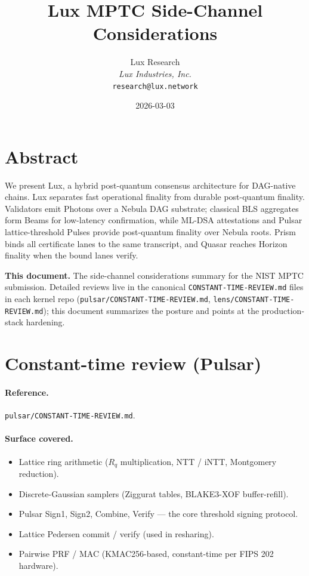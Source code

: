 \documentclass[11pt,a4paper]{article}
\title{Lux MPTC Side-Channel Considerations}
\author{
Lux Research\\
\textit{Lux Industries, Inc.}\\
\texttt{research@lux.network}
}
\date{2026-03-03}
\begin{document}
\luxcoverpage

\section*{Abstract}

\noindent We present Lux, a hybrid post-quantum consensus architecture for DAG-native chains. Lux separates fast operational finality from durable post-quantum finality. Validators emit Photons over a Nebula DAG substrate; classical BLS aggregates form Beams for low-latency confirmation, while ML-DSA attestations and Pulsar lattice-threshold Pulses provide post-quantum finality over Nebula roots. Prism binds all certificate lanes to the same transcript, and Quasar reaches Horizon finality when the bound lanes verify.

\textbf{This document.} The side-channel considerations summary for the NIST MPTC submission. Detailed reviews live in the canonical \texttt{CONSTANT-TIME-REVIEW.md} files in each kernel repo (\texttt{pulsar/CONSTANT-TIME-REVIEW.md}, \texttt{lens/CONSTANT-TIME-REVIEW.md}); this document summarizes the posture and points at the production-stack hardening.

\section{Constant-time review (Pulsar)}

\paragraph{Reference.} \texttt{pulsar/CONSTANT-TIME-REVIEW.md}.

\paragraph{Surface covered.}
\begin{itemize}[leftmargin=2em,nosep]
  \item Lattice ring arithmetic ($R_q$ multiplication, NTT / iNTT, Montgomery reduction).
  \item Discrete-Gaussian samplers (Ziggurat tables, BLAKE3-XOF buffer-refill).
  \item Pulsar Sign1, Sign2, Combine, Verify --- the core threshold signing protocol.
  \item Lattice Pedersen commit / verify (used in resharing).
  \item Pairwise PRF / MAC (KMAC256-based, constant-time per FIPS 202 hardware).
\end{itemize}
\end{document}
